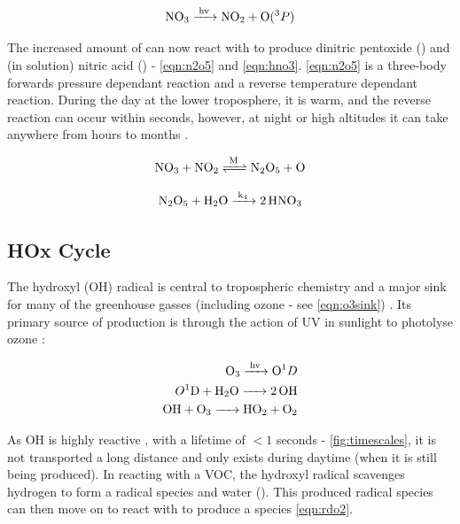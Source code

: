 \begin{equation}
  \ce{NO3 ->[hv] NO2 + O}(^3P)
  \label{eqn:nno3}
\end{equation}


 The increased amount of  can now react with  to produce dinitric pentoxide () and (in solution) nitric acid () - \autoref{eqn:n2o5} and \autoref{eqn:hno3}. \autoref{eqn:n2o5} is a three-body forwards pressure dependant reaction and a reverse temperature dependant reaction. During the day at the lower troposphere, it is warm, and the reverse reaction can occur within seconds, however, at night or high altitudes it can take anywhere from hours to months \citep{fundamentals}.


\begin{equation}
  \ce{NO3 + NO2 <=>[M] N2O5 + O}
  \label{eqn:n2o5}
\end{equation}

\begin{equation}
  \ce{N2O5 + H2O ->[k4] 2HNO3}
  \label{eqn:hno3}
\end{equation}



\subsection{HOx Cycle}
The hydroxyl (OH) radical is central to tropospheric chemistry and a major sink for many of the greenhouse gasses (including ozone - see \autoref{eqn:o3sink}) \citep{olson}. Its primary source of production is through the action of UV in sunlight to photolyse ozone \citep{fundamentals}:

\begin{align}
  \ce{O3 ->[hv] O}^1D\\
  O^1\ce{D + H2O -> 2OH}\\
  \ce{OH + O3 -> HO2 + O2} \label{eqn:o3sink}
\end{align}

As OH is highly reactive , with a lifetime of $<1$ seconds - \autoref{fig:timescales}, it is not transported a long distance and only exists during daytime (when it is still being produced). In reacting with a VOC, the hydroxyl radical scavenges hydrogen to form a radical species and water (). This produced radical species can then move on to react with  to produce a  species \autoref{eqn:rdo2}.%






